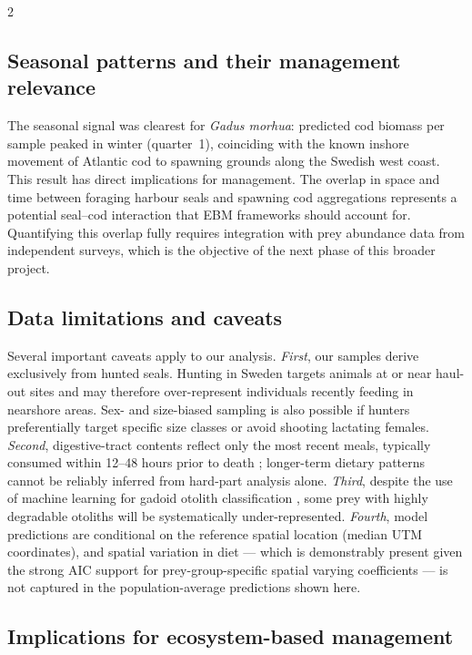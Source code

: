 \begin{spacing}{2}
\subsection{Seasonal patterns and their management relevance}

The seasonal signal was clearest for \textit{Gadus morhua}: predicted cod
biomass per sample peaked in winter (quarter~1), coinciding with the known
inshore movement of Atlantic cod to spawning grounds along the Swedish west
coast. This result has direct implications for management. The overlap in
space and time between foraging harbour seals and spawning cod aggregations
represents a potential seal--cod interaction that EBM frameworks should
account for. Quantifying this overlap fully requires integration with prey
abundance data from independent surveys, which is the objective of the next
phase of this broader project.

\subsection{Data limitations and caveats}

Several important caveats apply to our analysis. \textit{First}, our samples
derive exclusively from hunted seals. Hunting in Sweden targets animals at
or near haul-out sites and may therefore over-represent individuals recently
feeding in nearshore areas. Sex- and size-biased sampling is also possible
if hunters preferentially target specific size classes or avoid shooting
lactating females. \textit{Second}, digestive-tract contents reflect only
the most recent meals, typically consumed within 12--48 hours prior to
death \citep{GrEllier2005, daSilva1985}; longer-term dietary patterns
cannot be reliably inferred from hard-part analysis alone.
\textit{Third}, despite the use of machine learning for gadoid otolith
classification \citep{MionOtolith2024}, some prey with highly degradable
otoliths will be systematically under-represented. \textit{Fourth}, model
predictions are conditional on the reference spatial location (median UTM
coordinates), and spatial variation in diet --- which is demonstrably
present given the strong AIC support for prey-group-specific spatial varying
coefficients --- is not captured in the population-average predictions shown
here.

\subsection{Implications for ecosystem-based management}


\end{spacing}
